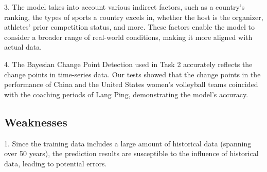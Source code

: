 \documentclass[12pt]{article}  %
\begin{document}
3. The model takes into account various indirect factors, such as a country's ranking, the types of sports a country excels in, whether the host is the organizer, athletes' prior competition status, and more. These factors enable the model to consider a broader range of real-world conditions, making it more aligned with actual data.

4. The Bayesian Change Point Detection used in Task 2 accurately reflects the change points in time-series data\cite{1}. Our tests showed that the change points in the performance of China and the United States women's volleyball teams coincided with the coaching periods of Lang Ping, demonstrating the model's accuracy.
\subsection{Weaknesses}
1. Since the training data includes a large amount of historical data (spanning over 50 years), the prediction results are susceptible to the influence of historical data, leading to potential errors.

 	
 	
\end{document}
